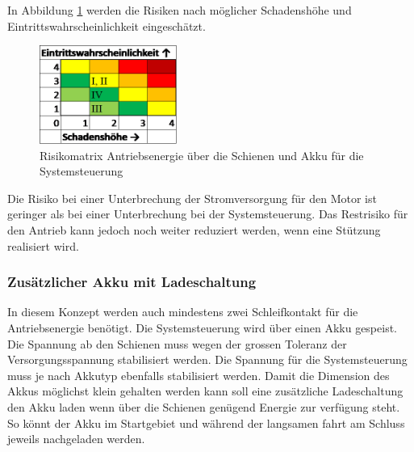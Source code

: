 \documentclass[../../../main.tex]{subfiles}
\begin{document}
    In Abbildung \ref{fig:strom_risikomatrix_akku} werden die Risiken nach möglicher Schadenshöhe und Eintrittswahrscheinlichkeit eingeschätzt.

    \begin{figure}[H]
        \centering
        \includegraphics[width=0.4\textwidth]{Strom_Risiko_Akku.png}
        \caption {Risikomatrix Antriebsenergie über die Schienen und Akku für die Systemsteuerung}
        \label{fig:strom_risikomatrix_akku}
    \end{figure}

    Die Risiko bei einer Unterbrechung der Stromversorgung für den Motor ist geringer als bei einer Unterbrechung bei der Systemsteuerung. Das Restrisiko für den Antrieb kann jedoch noch weiter reduziert werden, wenn eine Stützung realisiert wird.


    \subsubsection{Zusätzlicher Akku mit Ladeschaltung}
    In diesem Konzept werden auch mindestens zwei Schleifkontakt für die Antriebsenergie benötigt. Die Systemsteuerung wird über einen Akku gespeist. Die Spannung ab den Schienen muss wegen der grossen Toleranz der Versorgungsspannung stabilisiert werden. Die Spannung für die Systemsteuerung muss je nach Akkutyp ebenfalls stabilisiert werden.
    Damit die Dimension des Akkus möglichst klein gehalten werden kann soll eine zusätzliche Ladeschaltung den Akku laden wenn über die Schienen genügend Energie zur verfügung steht. So könnt der Akku im Startgebiet und während der langsamen fahrt am Schluss jeweils nachgeladen werden.
\end{document}
